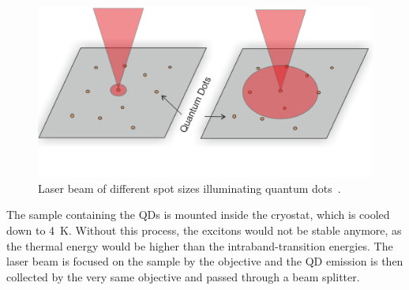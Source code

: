 \begin{figure}[H]
	\centering
	\includegraphics[width=0.7\linewidth]{figures/setup/micro-pl}
	\caption{Laser beam of different spot sizes illuminating quantum dots~\cite{reindl_characterisation_2014}.}
	\label{fig:micro-pl}
\end{figure}

The sample containing the \acp{QD} is mounted inside the cryostat, which is cooled down to \SI{4}{\kelvin}.
Without this process, the excitons would not be stable anymore, as the thermal energy would be higher than the intraband-transition energies.
The laser beam is focused on the sample by the objective and the \ac{QD} emission is then collected by the very same objective and passed through a beam splitter.
